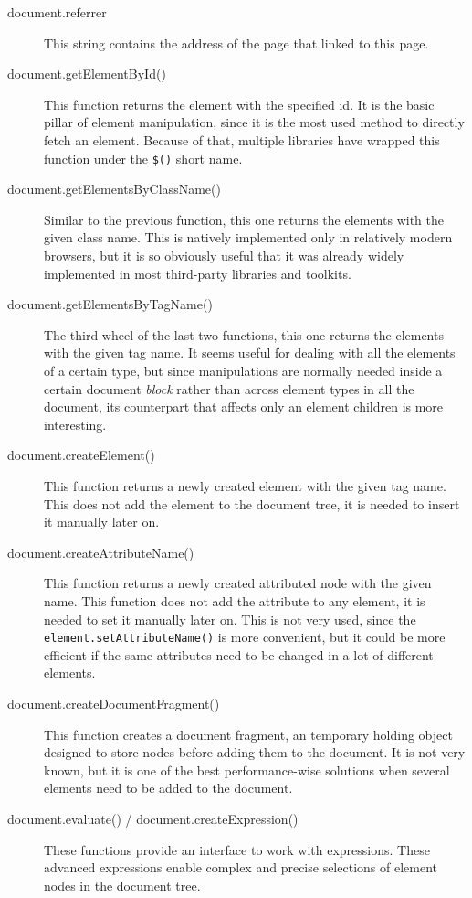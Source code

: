 \begin{description}
\begin{description}
    \item[document.referrer] This string contains the address of the page that linked to this page.
    \item[document.getElementById()] This function returns the element with the specified id.
    It is the basic pillar of element manipulation, since it is the most used method to directly fetch an element.
    Because of that, multiple libraries have wrapped this function under the \texttt{\$()} short name.
    \item[document.getElementsByClassName()] Similar to the previous function, this one returns the elements with the given class name.
    This is natively implemented only in relatively modern browsers, but it is so obviously useful that it was already widely implemented in most third-party libraries and toolkits.
    \item[document.getElementsByTagName()] The third-wheel of the last two functions, this one returns the elements with the given tag name.
    It seems useful for dealing with all the elements of a certain type, but since  manipulations are normally needed inside a certain document \emph{block} rather than across element types in all the document, its counterpart that affects only an element children is more interesting.
    \item[document.createElement()] This function returns a newly created element with the given tag name.
    This does not add the element to the document tree, it is needed to insert it manually later on.
    \item[document.createAttributeName()] This function returns a newly created attributed node with the given name.
    This function does not add the attribute to any element, it is needed to set it manually later on.
    This is not very used, since the \texttt{element.setAttributeName()} is more convenient, but it could be more efficient if the same attributes need to be changed in a lot of different elements.
    \item[document.createDocumentFragment()] This function creates a document fragment, an temporary holding object designed to store nodes before adding them to the document.
    It is not very known, but it is one of the best performance-wise solutions when several elements need to be added to the document.
    \item[document.evaluate() / document.createExpression()] These functions provide an interface to work with  expressions.
    These advanced expressions enable complex and precise selections of element nodes in the document tree.

\end{description}
\end{description}
